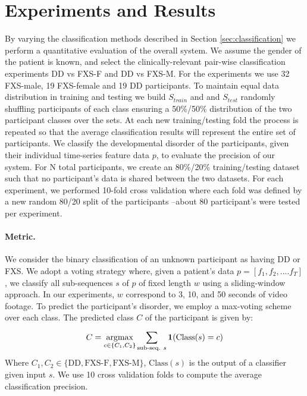 \documentclass{llncs}
\begin{document}
\section{Experiments and Results}
\vspace*{-\baselineskip}
By varying the classification methods described in Section \ref{sec:classification} we perform a quantitative evaluation of the overall system.
We assume the gender of the patient is known, and select the clinically-relevant pair-wise classification experiments DD vs FXS-F and DD vs FXS-M. For the experiments we use 32 FXS-male, 19 FXS-female and 19 DD participants. To maintain equal data distribution in training and testing we build $S_{train}$ and and $S_{test}$ randomly shuffling participants of each class ensuring a 50\%/50\% distribution of the two participant classes over the sets. At each new training/testing fold the process is repeated so that the average classification results will represent the entire set of participants. We classify the developmental disorder of the participants, given their individual time-series feature data $p$, to evaluate the precision of our system. For N total participants, we create an 80\%/20\% training/testing dataset such that no participant's data is shared between the two datasets. For each experiment, we performed 10-fold cross validation where each fold was defined by a new random 80/20 split of the participants --about 80 participant's were tested per experiment.   
\vspace*{-\baselineskip}

\paragraph{Metric.}
We consider the binary classification of an unknown participant as having DD or FXS. We adopt a voting strategy where, given a patient's data $p=[f_1, f_2,....f_{T}]$, we classify all sub-sequences $s$ of $p$ of fixed length $w$ using a sliding-window approach. In our experiments, $w$ correspond to 3, 10, and 50 seconds of video footage. To predict the participant's disorder, we employ a max-voting scheme over each class. The predicted class $C$ of the participant is given by:
  \begin{equation}
    C = \underset{c \in \{C_1, C_2\}} {\operatorname{argmax}} \sum_{\text{sub-seq. } s}^{} \bold{1}(\text{Class}(s) = c)
  \end{equation}
  Where $C_1, C_2 \in \{\text{DD}, \text{FXS-F}, \text{FXS-M}\}$, $\text{Class}(s)$ is the output of a classifier given input $s$. We use 10 cross validation folds to compute the average classification precision.
\vspace*{-2em}
\end{document}

